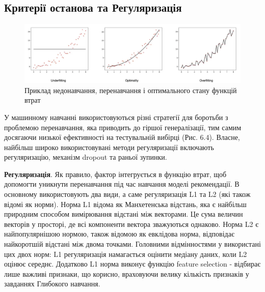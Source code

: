 \subsection{Критерії останова та Регуляризація}
\begin{figure}
    \centering
    \includegraphics[width=1\textwidth]{images/fiting_problems.png}
    \caption{Приклад недонавчання, перенавчання і оптимального стану функцій втрат}
\end{figure}
У машинному навчанні використовуються різні стратегії для боротьби з проблемою перенавчання, яка приводить до гіршої генералізації, тим самим досягаючи низької ефективності на тестувальній вибірці (Рис. 6.4). Власне, найбільш широко використовувані методи регуляризації включають регуляризацію, механізм dropout та раньої зупинки.

\textbf{Регуляризація}. Як правило, фактор інтегрується в функцію втрат, щоб допомогти уникнути перенавчання під час навчання моделі рекомендації. В основному використовують два види, а саме регуляризація L1 та L2 (які також відомі як норми). Норма L1 відома як Манхетенська відстань, яка є найбільш природним способом вимірювання відстані між векторами. Це сума величин векторів у просторі, де всі компоненти вектора зважуються однаково. Норма L2 є найпопулярнішою нормою, також відомою як евклідова норма, відповідає  найкоротшій відстані між двома точками. 
Головними відмінностями у використані цих двох норм: L1 регуляризація намагається оцінити медіану даних, коли L2 оцінює середнє.
Додатково L1 норма виконує функцію feature selection -  відбирає лише важливі признаки, що корисно, враховуючи велику кількість признаків у завданнях Глибокого навчання.

